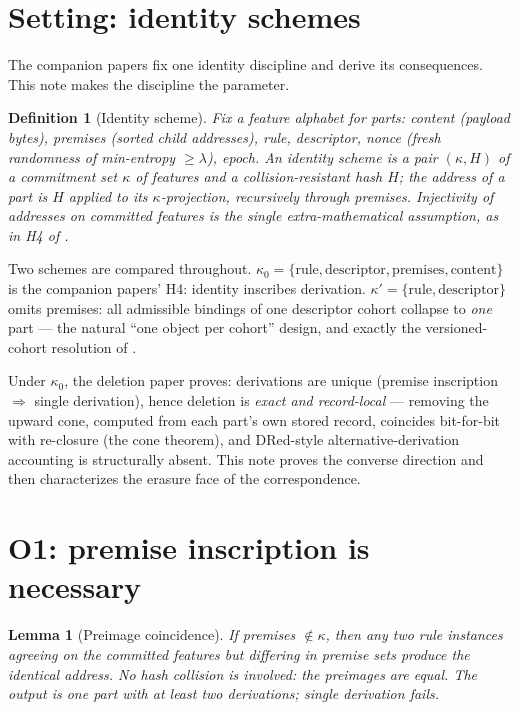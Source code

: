 \documentclass[10pt]{article}
\newtheorem{lemma}[theorem]{Lemma}
\newtheorem{definition}[theorem]{Definition}
\newcommand{\kz}{\kappa_0}
\newcommand{\kp}{\kappa'}
\begin{document}
\section{Setting: identity schemes}\label{sec:setting}

The companion papers fix one identity discipline and derive its consequences. This note makes the discipline the parameter.

\begin{definition}[Identity scheme]\label{def:scheme}
Fix a feature alphabet for parts: \emph{content} (payload bytes), \emph{premises} (sorted child addresses), \emph{rule}, \emph{descriptor}, \emph{nonce} (fresh randomness of min-entropy $\ge \lambda$), \emph{epoch}. An \emph{identity scheme} is a pair $(\kappa, H)$ of a commitment set $\kappa$ of features and a collision-resistant hash $H$; the address of a part is $H$ applied to its $\kappa$-projection, recursively through premises. Injectivity of addresses on committed features is the single extra-mathematical assumption, as in H4 of \cite{growth}.
\end{definition}

Two schemes are compared throughout. $\kz = \{\text{rule},\text{descriptor},\text{premises},\text{content}\}$ is the companion papers' H4: identity inscribes derivation. $\kp = \{\text{rule},\text{descriptor}\}$ omits premises: all admissible bindings of one descriptor cohort collapse to \emph{one} part --- the natural ``one object per cohort'' design, and exactly the versioned-cohort resolution of \cite[\S6.2]{growth}.

Under $\kz$, the deletion paper proves: derivations are unique (premise inscription $\Rightarrow$ single derivation), hence deletion is \emph{exact and record-local} --- removing the upward cone, computed from each part's own stored record, coincides bit-for-bit with re-closure (the cone theorem), and DRed-style alternative-derivation accounting \cite{GuptaMS93} is structurally absent. This note proves the converse direction and then characterizes the erasure face of the correspondence.

\section{O1: premise inscription is necessary}\label{sec:o1}

\begin{lemma}[Preimage coincidence]\label{lem:coincide}
If premises $\notin \kappa$, then any two rule instances agreeing on the committed features but differing in premise sets produce the \emph{identical} address. No hash collision is involved: the preimages are equal. The output is one part with at least two derivations; single derivation fails.
\end{lemma}
\end{document}
